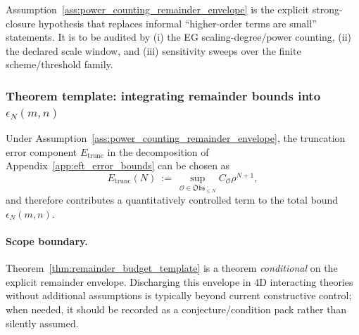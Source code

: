 \AuditTag Assumption~\ref{ass:power_counting_remainder_envelope} is the explicit strong-closure hypothesis that replaces informal ``higher-order terms are small'' statements.
It is to be audited by (i) the EG scaling-degree/power counting, (ii) the declared scale window, and (iii) sensitivity sweeps over the finite scheme/threshold family.

\subsubsection{Theorem template: integrating remainder bounds into $\epsilon_N(m,n)$}
\begin{theorem}
\label{thm:remainder_budget_template}
Under Assumption~\ref{ass:power_counting_remainder_envelope}, the truncation error component $E_{\mathrm{trunc}}$ in the decomposition of Appendix~\ref{app:eft_error_bounds} can be chosen as
\[
E_{\mathrm{trunc}}(N)\ :=\ \sup_{\mathcal{O}\in\mathfrak{Obs}_{\le N}} C_{\mathcal{O}}\rho^{N+1},
\]
and therefore contributes a quantitatively controlled term to the total bound $\epsilon_N(m,n)$.
\end{theorem}

\paragraph{Scope boundary.}
\AuditTag Theorem~\ref{thm:remainder_budget_template} is a theorem \emph{conditional} on the explicit remainder envelope.
Discharging this envelope in 4D interacting theories without additional assumptions is typically beyond current constructive control; when needed, it should be recorded as a conjecture/condition pack rather than silently assumed.

